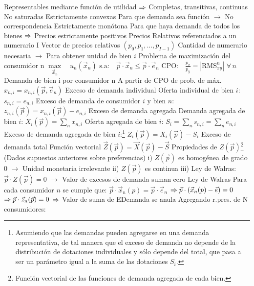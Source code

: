 \documentclass{nuevotema}
\begin{document}
\begin{esquemal}
				\4 Representables mediante función de utilidad
				\4[] $\Rightarrow$ Completas, transitivas, continuas
				\4 No saturadas
				\4 Estrictamente convexas
				\4[] Para que demanda sea función
				\4[] $\to$ No correspondencia
				\4 Estrictamente monótona
				\4[] Para que haya demanda de todos los bienes
				\4[] $\Rightarrow$ Precios estrictamente positivos
			\3 Precios
				\4 Relativos referenciados a un numerario I
				\4 Vector de precios relativos
				\4[] $(p_0, p_1, ..., p_{I-1})$
				\4[] Cantidad de numerario necesaria
				\4[] $\to$ Para obtener unidad de bien $i$
			\3 Problema de maximización del consumidor n
				\4[] $\underset{\vec{x}_n}{\max} \quad u_n(\vec{x}_n)$
				\4[] $\text{s.a:} \quad \vec{p} \cdot \vec{x}_n \leq \vec{p} \cdot \vec{e}_n $
				\4[] $\text{CPO:} \quad \frac{p_x}{p_y} = |\text{RMS}_{xy}^n|$ \quad $\forall \, n$
			\3 Demanda de bien i por consumidor n
				\4 A partir de CPO de prob. de máx.
				\4[] $x_{n,i} = x_{n,i}(\vec{p}, \vec{e}_n)$
			\3 Exceso de demanda individual
				\4 Oferta individual de bien $i$:
				\4[] $s_{n,i} = e_{n,i}$
				\4 Exceso de demanda de consumidor $i$ y bien $n$:
				\4[] $z_{n,i} (\vec{p}) = x_{n,i}(\vec{p}) - e_{n,i}$
			\3 Exceso de demanda agregada
				\4 Demanda agregada de bien $i$:
				\4[] $X_i(\vec{p}) = \sum_n x_{n,i}$
				\4 Oferta agregada de bien $i$:
				\4[] $S_i = \sum_n s_{n,i} = \sum_n e_{n,i}$
				\4 Exceso de demanda agregada de bien $i$:\footnote{Asumiendo que las demandas pueden agregarse en una demanda representativa, de tal manera que el exceso de demanda no depende de la distribución de dotaciones individuales y sólo depende del total, que pasa a ser un parámetro igual a la suma de las dotaciones $S_i$.}
				\4[] $Z_i(\vec{p}) = X_i(\vec{p}) - S_i$
				\4 Exceso de demanda total
				\4[] Función vectorial
				\4[] $\vec{Z} (\vec{p}) = \vec{X}(\vec{p}) - \vec{S}  $
				\4 Propiedades de $Z(\vec{p})$\footnote{Función vectorial de las funciones de demanda agregada de cada bien.}
				\4[] (Dados supuestos anteriores sobre preferencias)
				\4[] i) $Z(\vec{p})$ es homogénea de grado 0
				\4[] $\to$ Unidad monetaria irrelevante
				\4[] ii) $Z(\vec{p})$ es continua
				\4[] iii) Ley de Walras: $\vec{p} \cdot Z(\vec{p}) = 0$
				\4[] $\to$ Valor de excesos de demanda suman cero
			\3 Ley de Walras
				\4 Para cada consumidor $n$ se cumple que:
				\4[] $\vec{p} \cdot \vec{x}_n(p) = \vec{p} \cdot \vec{e}_n$
				\4[] $\Rightarrow \vec{p} \cdot (\vec{x}_n(p) - \vec{e}) = 0$
				\4[] $\Rightarrow \vec{p} \cdot \vec{z}_n(\vec{p}) = 0 $
				\4[] $\Rightarrow$ Valor de suma de EDemanda se anula
				\4 Agregando r.pres. de N consumidores:

\end{esquemal}
\end{document}

